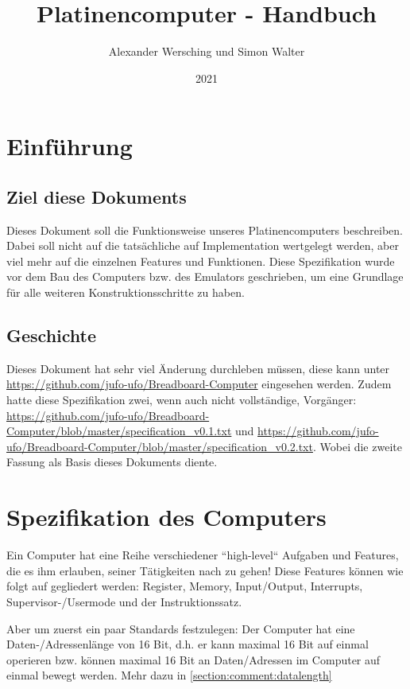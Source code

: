 \documentclass{scrartcl}
\begin{document}
\title{Platinencomputer - Handbuch}
\author{Alexander Wersching und Simon Walter}
\date{2021}
\maketitle
\newpage


\tableofcontents
\newpage

\section{Einführung}
\subsection{Ziel diese Dokuments}
Dieses Dokument soll die Funktionsweise unseres Platinencomputers beschreiben. Dabei soll nicht auf die tatsächliche auf Implementation wertgelegt werden, aber viel mehr auf die einzelnen Features und Funktionen. Diese Spezifikation wurde vor dem Bau des Computers bzw. des Emulators geschrieben, um eine Grundlage für alle weiteren Konstruktionsschritte zu haben. 

\subsection{Geschichte}
Dieses Dokument hat sehr viel Änderung durchleben müssen, diese kann unter \url{https://github.com/jufo-ufo/Breadboard-Computer} eingesehen werden. Zudem hatte diese Spezifikation zwei, wenn auch nicht vollständige, Vorgänger: \url{https://github.com/jufo-ufo/Breadboard-Computer/blob/master/specification_v0.1.txt} und \url{https://github.com/jufo-ufo/Breadboard-Computer/blob/master/specification_v0.2.txt}. Wobei die zweite Fassung als Basis dieses Dokuments diente.




\section{Spezifikation des Computers}
Ein Computer hat eine Reihe verschiedener ``high-level`` Aufgaben und Features, die es ihm erlauben, seiner Tätigkeiten nach zu gehen! 
Diese Features können wie folgt auf gegliedert werden: Register, Memory, Input/Output, Interrupts, Supervisor-/Usermode und der Instruktionssatz.

Aber um zuerst ein paar Standards festzulegen: Der Computer hat eine Daten-/Adressenlänge von 16 Bit, d.h. er kann maximal 16 Bit auf einmal operieren bzw. können maximal 16 Bit an Daten/Adressen im Computer auf einmal bewegt werden. Mehr dazu in \autoref{section:comment:datalength}
\end{document}

